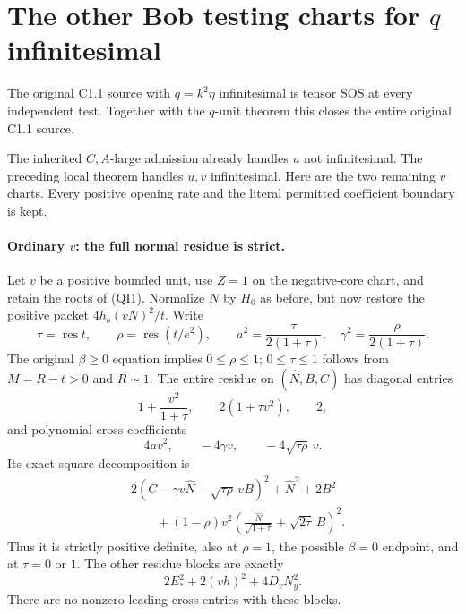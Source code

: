 \section{The other Bob testing charts for $q$ infinitesimal}
\label{sec:r7-c1-q-inf-remote}
\begin{theorem}
The original C1.1 source with $q=k^2\eta$ infinitesimal is tensor SOS
at every independent test. Together with the $q$-unit theorem this
closes the entire original C1.1 source.
\end{theorem}
The inherited $C,A$-large admission already handles $u$ not
infinitesimal. The preceding local theorem handles $u,v$
infinitesimal. Here are the two remaining $v$ charts. Every positive
opening rate and the literal permitted coefficient boundary is kept.

\paragraph{Ordinary $v$: the full normal residue is strict.}
Let $v$ be a positive bounded unit, use $Z=1$ on the negative-core
chart, and retain the roots of (QI1). Normalize $N$ by $H_0$ as
before, but now restore the positive packet $4h_b(vN)^2/t$.
Write
\[
 \tau=\operatorname{res}t,\qquad
 \rho=\operatorname{res}(t/e^2),\qquad
 a^2=\frac{\tau}{2(1+\tau)},\quad
 \gamma^2=\frac{\rho}{2(1+\tau)}.
\]
The original $\beta\ge0$ equation implies $0\le\rho\le1$;
$0\le\tau\le1$ follows from $M=R-t>0$ and $R\sim1$.
The entire residue on $(\widehat N,B,C)$ has diagonal entries
\[
 1+\frac{v^2}{1+\tau},\qquad 2(1+\tau v^2),\qquad 2,
\]
and polynomial cross coefficients
\[
 4av^2,\qquad -4\gamma v,\qquad -4\sqrt{\tau\rho}\,v.
\]
Its exact square decomposition is
\begin{align*}
 &2(C-\gamma v\widehat N-\sqrt{\tau\rho}\,vB)^2
       +\widehat N^2+2B^2\\
 &\qquad +(1-\rho)v^2
    \left(\frac{\widehat N}{\sqrt{1+\tau}}+
                         \sqrt{2\tau}\,B\right)^2.
 \tag{QR1}
\end{align*}
Thus it is strictly positive definite, also at $\rho=1$, the
possible $\beta=0$ endpoint, and at $\tau=0$ or $1$.
The other residue blocks are exactly
\[
                       2E_*^2+2(vh)^2+4D_vN_y^2.
\]
There are no nonzero leading cross entries with these blocks.

